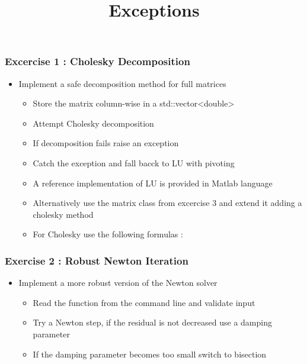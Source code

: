 \documentclass[smaller,a4paper,allowframebreaks]{beamer}
\begin{document}
\title{Exceptions}
\frame{\titlepage}

\begin{frame}
\frametitle{Excercise 1 : Cholesky Decomposition}
\begin{itemize}
\item Implement a safe decomposition method for full matrices
      \begin{itemize}
            \item Store the matrix column-wise in a std::vector<double>             
            \item Attempt Cholesky decomposition
            \item If decomposition fails raise an exception
            \item Catch the exception and fall bacck to LU with pivoting
            \item A reference implementation of LU is provided in Matlab language
            \item Alternatively use the matrix class from excercise 3 and extend it adding a cholesky method
            \item For Cholesky use the following formulas :\\[3mm]
      \end{itemize}      
\end{itemize}
\end{frame}


\begin{frame}
\frametitle{Exercise 2 : Robust Newton Iteration}
\begin{itemize}
\item Implement a more robust version of the Newton solver
      \begin{itemize}
            \item Read the function from the command line and validate input
            \item Try a Newton step, if the residual is not decreased use a damping parameter
            \item If the damping parameter becomes too small switch to bisection
      \end{itemize}      
\end{itemize}

\end{frame}
\end{document}
